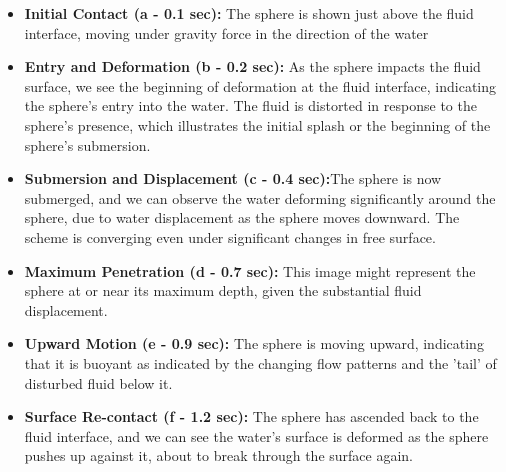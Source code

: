 \begin{itemize}
    \item \textbf{Initial Contact (a - 0.1 sec):} The sphere is shown just above the fluid interface, moving under gravity force in the direction of the water
    \item \textbf{Entry and Deformation (b - 0.2 sec):} As the sphere impacts the fluid surface, we see the beginning of deformation at the fluid interface, indicating the sphere's entry into the water. The fluid is distorted in response to the sphere's presence, which illustrates the initial splash or the beginning of the sphere's submersion.
    \item \textbf{Submersion and Displacement (c - 0.4 sec):}The sphere is now submerged, and we can observe the water deforming significantly around the sphere, due to water displacement as the sphere moves downward. The scheme is converging even under significant changes in free surface.
    \item \textbf{Maximum Penetration (d - 0.7 sec):} This image might represent the sphere at or near its maximum depth, given the substantial fluid displacement.
    \item \textbf{Upward Motion (e - 0.9 sec):} The sphere is moving upward, indicating that it is buoyant as indicated by the changing flow patterns and the 'tail' of disturbed fluid below it.
    \item \textbf{Surface Re-contact (f - 1.2 sec):} The sphere has ascended back to the fluid interface, and we can see the water's surface is deformed as the sphere pushes up against it, about to break through the surface again.
\end{itemize}

